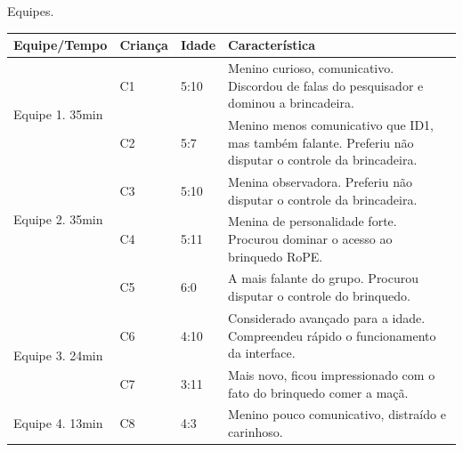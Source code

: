 \begin{quadro}[!h]
    \caption{Equipes.}
    \label{quadro:equipes}
    \centering
    {
        \begin{footnotesize}
        {\renewcommand{\arraystretch}{1.2}
        \begin{tabular}{|l|l|l|p{11cm}|} 
            \hline
            \textbf{ Equipe/Tempo }                         & \textbf{Criança } & \textbf{Idade} & \textbf{Característica} \\ 
            \hline
            \multirow{2}{*}{Equipe 1. 35min}                & C1               & 5:10                         & Menino curioso, comunicativo. Discordou de falas do pesquisador e dominou a brincadeira.                           \\ 
            \cline{2-4}
                                                            & C2               & 5:7                          & Menino menos comunicativo que ID1, mas também falante. Preferiu não disputar o controle da brincadeira.            \\ 
            \hline
            \multirow{2}{*}{Equipe 2. 35min}                & C3               & 5:10                         & Menina observadora. Preferiu não disputar o controle da brincadeira.                                               \\ 
            \cline{2-4}
            \multicolumn{1}{|c|}{}                          & C4               & 5:11                         & Menina de personalidade forte. Procurou dominar o acesso ao brinquedo RoPE.                                        \\ 
            \cline{2-4}
            \multicolumn{1}{|c|}{}                          & C5               & 6:0                          & A mais falante do grupo. Procurou disputar o controle do brinquedo.                                                \\ 
            \hline
            \multirow{2}{*}{Equipe 3. 24min}                & C6               & 4:10                         & Considerado avançado para a idade. Compreendeu rápido o funcionamento da interface.                                \\ 
            \cline{2-4}
                                                            & C7               & 3:11                         & Mais novo, ficou impressionado com o fato do brinquedo comer a maçã.                                               \\ 
            \hline
            Equipe 4. 13min                                 & C8               & 4:3                          & Menino pouco comunicativo, distraído e carinhoso.                                                                  \\ 

\end{tabular}}
\end{footnotesize}}
\end{quadro}
